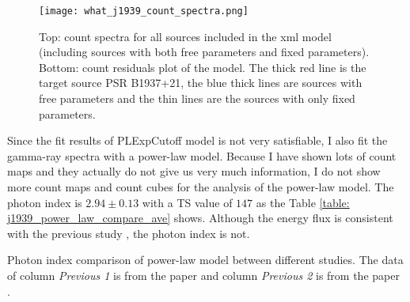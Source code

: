 \documentclass[12pt]{report}
\newcommand{\mycaption}[1]{\protect \caption{#1}}
\newcommand{\add}[1]{
  $<$\colorbox{red}{\textbf{add}}$>$#1$<$\colorbox{red}{\textbf{/add}}$>$
}
\begin{document}
        \begin{figure}[!htp]
          \centering 
          \texttt{[image: what\_j1939\_count\_spectra.png]}
          \caption{Top: count spectra for all sources included in the xml model (including 
            sources with both free parameters and fixed parameters). Bottom: count residuals plot
            of the model. The thick red line is the target source PSR B1937+21, the blue thick 
            lines are sources with free parameters and the thin lines are the sources with only 
            fixed parameters.}
          \label{fig: j1939_count_spectra_ave}
        \end{figure}
            


        Since the fit results of PLExpCutoff model is not very satisfiable, I also fit the 
        gamma-ray spectra with a power-law model. Because I have shown lots of count maps 
        and they actually do not give us very much information, I do not show more count maps 
        and count cubes for the analysis of the power-law model. The photon index is 
        $2.94\pm0.13$ with a TS value of $147$ as the Table 
        \ref{table: j1939_power_law_compare_ave} shows. Although the energy flux is consistent 
        with the previous study \citep{0004-637X-787-2-167}, the photon 
        index is not.
        \begin{table}[!htp]
          \centering
            \mycaption{Photon index comparison of power-law model between different 
              studies. The data of column \textit{Previous 1} is from the paper 
              \citep{0004-637X-787-2-167} and column \textit{Previous 2}
              is from the paper \citep{J1939_old}.}
            \label{table: j1939_power_law_compare_ave}        
        \end{table}  
\end{document}

